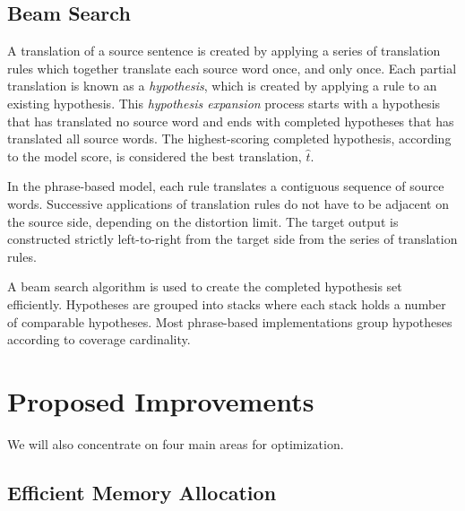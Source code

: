 \documentclass[11pt]{article}
\begin{document}

\subsection{Beam Search}

A translation of a source sentence is created by applying a series of translation rules which together translate each source word once, and only once. Each partial translation is known as a \emph{hypothesis}, which is created by applying a rule to an existing hypothesis. This \emph{hypothesis expansion} process starts with a hypothesis that has translated no source word and ends with completed hypotheses that has translated all source words. The highest-scoring completed hypothesis, according to the model score, is considered the best translation, $\hat{t} $.

In the phrase-based model, each rule translates a contiguous sequence of source words. Successive applications of translation rules do not have to be adjacent on the source side, depending on the distortion limit. The target output is constructed strictly left-to-right from the target side from the series of translation rules. 

A beam search algorithm is used to create the completed hypothesis set efficiently. Hypotheses are grouped into stacks where each stack holds a number of comparable hypotheses. Most phrase-based implementations group hypotheses according to coverage cardinality. %

\section{Proposed Improvements}

We will also concentrate on four main areas for optimization.

\subsection{Efficient Memory Allocation}
\end{document}
